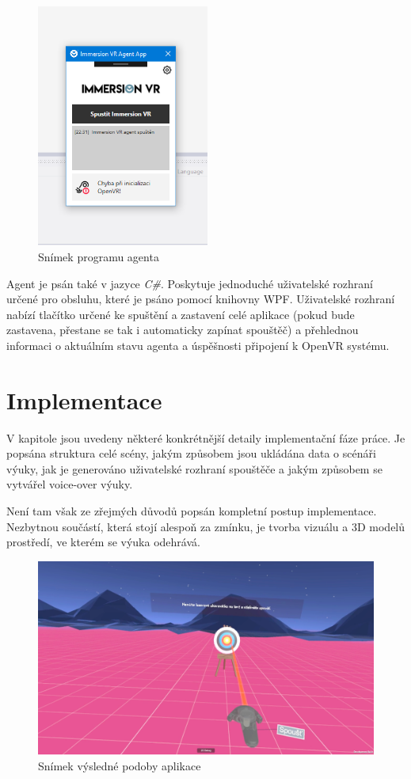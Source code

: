 \begin{figure}[h!]
\centering
\includegraphics[height=8cm]{src/assets/agent-screen.png}
\caption{Snímek programu agenta}
\end{figure}

Agent je psán také v jazyce \emph{C\#}. Poskytuje jednoduché uživatelské
rozhraní určené pro obsluhu, které je psáno pomocí knihovny WPF.
Uživatelské rozhraní nabízí tlačítko určené ke spuštění a zastavení celé
aplikace (pokud bude zastavena, přestane se tak i automaticky zapínat
spouštěč) a přehlednou informaci o aktuálním stavu agenta a úspěšnosti
připojení k OpenVR systému.

\section{Implementace}\label{implementace}

V kapitole jsou uvedeny některé konkrétnější detaily implementační fáze
práce. Je popsána struktura celé scény, jakým způsobem jsou ukládána
data o scénáři výuky, jak je generováno uživatelské rozhraní spouštěče a
jakým způsobem se vytvářel voice-over výuky.

Není tam však ze zřejmých důvodů popsán kompletní postup
implementace. Nezbytnou součástí, která stojí alespoň za zmínku, je
tvorba vizuálu a 3D modelů prostředí, ve kterém se výuka odehrává.

\begin{figure}[h!]
\centering
\includegraphics[width=12cm]{src/assets/result.png}
\caption{Snímek výsledné podoby aplikace}
\end{figure}

